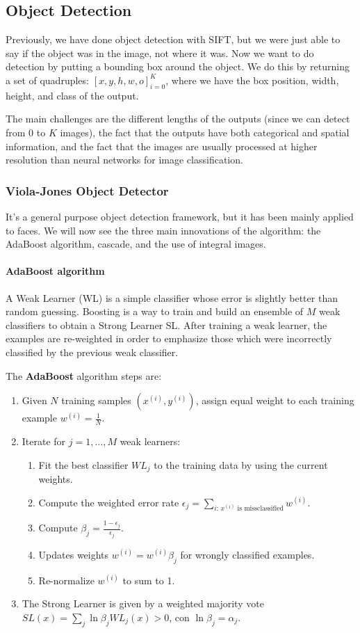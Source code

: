 \subsection{Object Detection}
Previously, we have done object detection with SIFT, but we were just able to say if the object was in the image, not where it was.
Now we want to do detection by putting a bounding box around the object.
We do this by returning a set of quadruples: $[x, y, h, w, o]_{i=0}^{K}$, where we have the box position, width, height, and class of the output.

The main challenges are the different lengths of the outputs (since we can detect from 0 to $K$ images), the fact that the outputs have both categorical and spatial information, and the fact that the images are usually processed at higher resolution than neural networks for image classification.

\subsubsection{Viola-Jones Object Detector}
It's a general purpose object detection framework, but it has been mainly applied to faces.
We will now see the three main innovations of the algorithm: the AdaBoost algorithm, cascade, and the use of integral images.

\paragraph{AdaBoost algorithm}
A Weak Learner (WL) is a simple classifier whose error is slightly better than random guessing.
Boosting is a way to train and build an ensemble of $M$ weak classifiers to obtain a Strong Learner SL.
After training a weak learner, the examples are re-weighted in order to emphasize those which were incorrectly classified by the previous weak classifier.

The \textbf{AdaBoost} algorithm steps are:
\begin{enumerate}
  \item Given $N$ training samples $(x^{(i)}, y^{(i)})$, assign equal weight to each training example $w^{(i)}=\frac{1}{N}$.
  \item Iterate for $j = 1, ..., M$ weak learners:
  \begin{enumerate}
    \item Fit the best classifier $WL_j$ to the training data by using the current weights.
    \item Compute the weighted error rate $\epsilon_j = \sum_{i:\, x^{(i)} \text{ is missclassified}} w^{(i)}$.
    \item Compute $\beta_j = \frac{1 - \epsilon_j}{\epsilon_j}$.
    \item Updates weights $w^{(i)} = w^{(i)}\beta_j$ for wrongly classified examples.
    \item Re-normalize $w^{(i)}$ to sum to 1.
  \end{enumerate}
  \item The Strong Learner is given by a weighted majority vote $SL(x) = \sum_{j} \ln \beta_j WL_j(x) > 0$, con $\ln \beta_j = \alpha_j$.
\end{enumerate}

